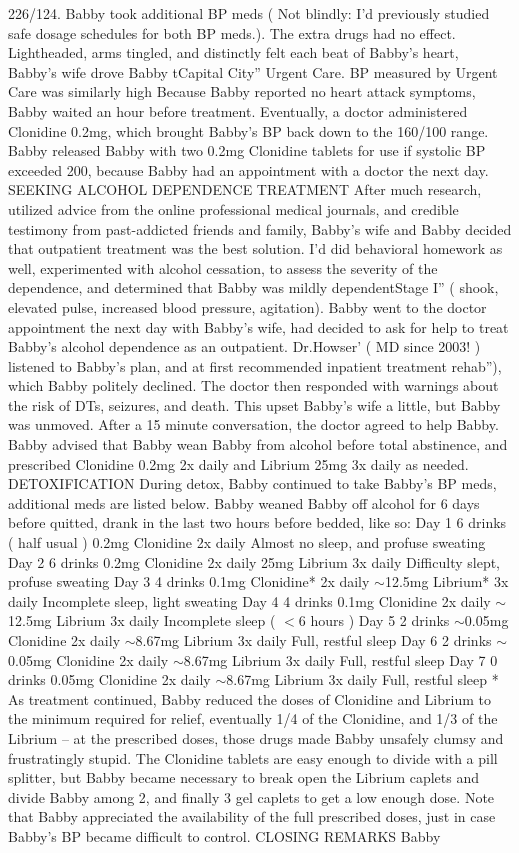 \documentclass[12pt]{book}
\begin{document}
226/124. Babby took additional BP meds ( Not blindly: I'd previously studied safe dosage schedules for both BP meds.). The extra drugs had no effect. Lightheaded, arms tingled, and distinctly felt each beat of Babby's heart, Babby's wife drove Babby tCapital City'' Urgent Care. BP measured by Urgent Care was similarly high Because Babby reported no heart attack symptoms, Babby waited an hour before treatment. Eventually, a doctor administered Clonidine 0.2mg, which brought Babby's BP back down to the 160/100 range. Babby released Babby with two 0.2mg Clonidine tablets for use if systolic BP exceeded 200, because Babby had an appointment with a doctor the next day. SEEKING ALCOHOL DEPENDENCE TREATMENT After much research, utilized advice from the online professional medical journals, and credible testimony from past-addicted friends and family, Babby's wife and Babby decided that outpatient treatment was the best solution. I'd did behavioral homework as well, experimented with alcohol cessation, to assess the severity of the dependence, and determined that Babby was mildly dependentStage I'' ( shook, elevated pulse, increased blood pressure, agitation). Babby went to the doctor appointment the next day with Babby's wife, had decided to ask for help to treat Babby's alcohol dependence as an outpatient. Dr.Howser' ( MD since 2003! ) listened to Babby's plan, and at first recommended inpatient treatment rehab''), which Babby politely declined. The doctor then responded with warnings about the risk of DTs, seizures, and death. This upset Babby's wife a little, but Babby was unmoved. After a 15 minute conversation, the doctor agreed to help Babby. Babby advised that Babby wean Babby from alcohol before total abstinence, and prescribed Clonidine 0.2mg 2x daily and Librium 25mg 3x daily as needed. DETOXIFICATION During detox, Babby continued to take Babby's BP meds, additional meds are listed below. Babby weaned Babby off alcohol for 6 days before quitted, drank in the last two hours before bedded, like so: Day 1 6 drinks ( half usual ) 0.2mg Clonidine 2x daily Almost no sleep, and profuse sweating Day 2 6 drinks 0.2mg Clonidine 2x daily 25mg Librium 3x daily Difficulty slept, profuse sweating Day 3 4 drinks 0.1mg Clonidine* 2x daily $\sim$12.5mg Librium* 3x daily Incomplete sleep, light sweating Day 4 4 drinks 0.1mg Clonidine 2x daily $\sim$12.5mg Librium 3x daily Incomplete sleep ( $<$6 hours ) Day 5 2 drinks $\sim$0.05mg Clonidine 2x daily $\sim$8.67mg Librium 3x daily Full, restful sleep Day 6 2 drinks $\sim$0.05mg Clonidine 2x daily $\sim$8.67mg Librium 3x daily Full, restful sleep Day 7 0 drinks 0.05mg Clonidine 2x daily $\sim$8.67mg Librium 3x daily Full, restful sleep * As treatment continued, Babby reduced the doses of Clonidine and Librium to the minimum required for relief, eventually 1/4 of the Clonidine, and 1/3 of the Librium -- at the prescribed doses, those drugs made Babby unsafely clumsy and frustratingly stupid. The Clonidine tablets are easy enough to divide with a pill splitter, but Babby became necessary to break open the Librium caplets and divide Babby among 2, and finally 3 gel caplets to get a low enough dose. Note that Babby appreciated the availability of the full prescribed doses, just in case Babby's BP became difficult to control. CLOSING REMARKS Babby 
\end{document}
